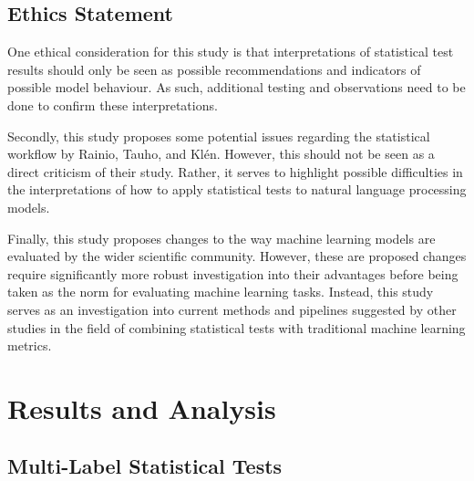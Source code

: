 \documentclass[10.7pt, onecolumn]{article}
\begin{document}
\subsection{Ethics Statement}

One ethical consideration for this study is that interpretations of statistical test results should only be seen as possible recommendations and indicators of possible model behaviour. As such, additional testing and observations need to be done to confirm these interpretations.

Secondly, this study proposes some potential issues regarding the statistical workflow by Rainio, Tauho, and Klén\cite{statsBased}. However, this should not be seen as a direct criticism of their study. Rather, it serves to highlight possible difficulties in the interpretations of how to apply statistical tests to natural language processing models.

Finally, this study proposes changes to the way machine learning models are evaluated by the wider scientific community. However, these are proposed changes require significantly more robust investigation into their advantages before being taken as the norm for evaluating machine learning tasks. Instead, this study serves as an investigation into current methods and pipelines suggested by other studies in the field of combining statistical tests with traditional machine learning metrics.

\section{Results and Analysis}\label{results}

\subsection{Multi-Label Statistical Tests}
\end{document}
